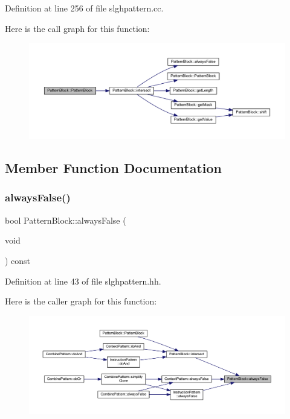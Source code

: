 Definition at line 256 of file slghpattern.\+cc.

Here is the call graph for this function\+:
\nopagebreak
\begin{figure}[H]
\begin{center}
\leavevmode
\includegraphics[width=350pt]{class_pattern_block_a32b31cc7039db67430b9a439cceb6cb8_cgraph}
\end{center}
\end{figure}


\subsection{Member Function Documentation}
\mbox{\label{class_pattern_block_ad5ce02e816a42c5278db7580fbc29bb5}} 
\subsubsection{\texorpdfstring{alwaysFalse()}{alwaysFalse()}}
{\footnotesize\ttfamily bool Pattern\+Block\+::always\+False (\begin{DoxyParamCaption}\item[{void}]{ }\end{DoxyParamCaption}) const\hspace{0.3cm}{\ttfamily [inline]}}



Definition at line 43 of file slghpattern.\+hh.

Here is the caller graph for this function\+:
\nopagebreak
\begin{figure}[H]
\begin{center}
\leavevmode
\includegraphics[width=350pt]{class_pattern_block_ad5ce02e816a42c5278db7580fbc29bb5_icgraph}
\end{center}
\end{figure}
\mbox{\label{class_pattern_block_aa891af56e7ea4582f0afb6d32efead2b}} 
